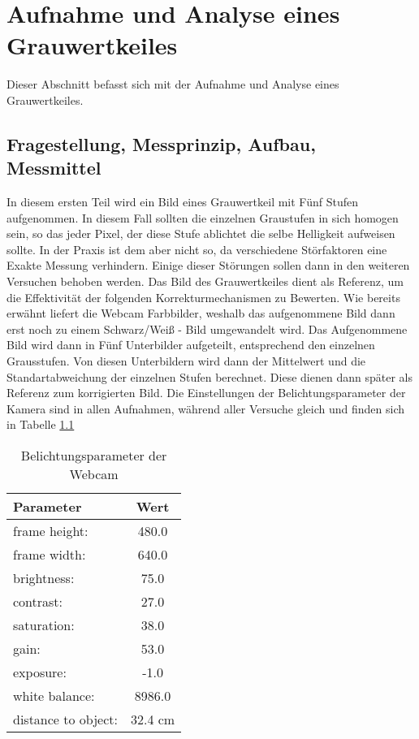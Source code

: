 %
%
\chapter{Aufnahme und Analyse eines Grauwertkeiles}
\label{chap:VERSUCH_1}
Dieser Abschnitt befasst sich mit der Aufnahme und Analyse eines Grauwertkeiles.
\section{Fragestellung, Messprinzip, Aufbau, Messmittel}
\label{chap:VERSUCH_1_FRAGESTELLUNG}
In diesem ersten Teil wird ein Bild eines Grauwertkeil mit Fünf Stufen aufgenommen. In diesem Fall sollten die einzelnen Graustufen in sich homogen sein, so das jeder Pixel, der diese Stufe ablichtet die selbe Helligkeit aufweisen sollte. In der Praxis ist dem aber nicht so, da verschiedene Störfaktoren eine Exakte Messung verhindern. Einige dieser Störungen sollen dann in den weiteren Versuchen behoben werden. Das Bild des Grauwertkeiles dient als Referenz, um die Effektivität der folgenden Korrekturmechanismen zu Bewerten. Wie bereits erwähnt liefert die Webcam Farbbilder, weshalb das aufgenommene Bild dann erst noch zu einem Schwarz/Weiß - Bild umgewandelt wird. Das Aufgenommene Bild wird dann in Fünf Unterbilder aufgeteilt, entsprechend den einzelnen Grausstufen. Von diesen Unterbildern wird dann der Mittelwert und die Standartabweichung der einzelnen Stufen berechnet. Diese dienen dann später als Referenz zum korrigierten Bild. Die Einstellungen der Belichtungsparameter der Kamera sind in allen Aufnahmen, während aller Versuche gleich und finden sich in Tabelle \ref{tab:BelichtungsParamter}


\begin{table}[H]
\centering
\begin{tabular}{l|c}
Parameter & Wert \\
\hline
frame height: & 480.0 \\
frame width: & 640.0 \\
\hline
brightness:  &  75.0 \\
contrast:    &  27.0 \\
saturation:  &  38.0\\
gain:        &  53.0\\
exposure:    &  -1.0\\
\hline
white balance: & 8986.0 \\
\hline
distance to object: & 32.4 cm \\
\end{tabular}
\caption{Belichtungsparameter der Webcam}
\label{tab:BelichtungsParamter}
\end{table}


